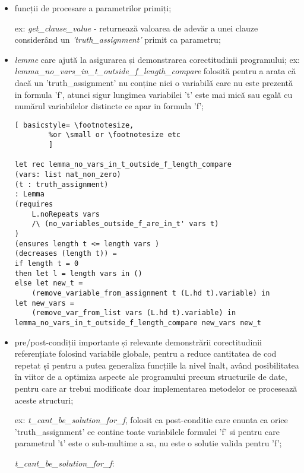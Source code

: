 \begin{itemize}
	\item  funcții de procesare a parametrilor primiți;
		
	ex: \textit{get\_clause\_value }- returnează valoarea de adevăr a unei clauze considerând un \textit{'truth\_assignment'} primit ca parametru;
	
	\item \textit{lemme} care ajută la asigurarea și demonstrarea corectitudinii programului;
	ex: \textit{lemma\_no\_vars\_in\_t\_outside\_f\_length\_compare} folosită pentru a arata că dacă un 'truth\_assignment' nu conține nici o variabilă care nu este prezentă in formula 'f', atunci sigur lungimea variabilei 't' este mai mică sau egală cu numărul variabilelor distincte ce apar in formula 'f';
	
	\begin{lstlisting}[	basicstyle= \footnotesize, 
		%or \small or \footnotesize etc
		]

let rec lemma_no_vars_in_t_outside_f_length_compare
(vars: list nat_non_zero) 
(t : truth_assignment) 
: Lemma
(requires 
	L.noRepeats vars 
	/\ (no_variables_outside_f_are_in_t' vars t)
)
(ensures length t <= length vars ) 
(decreases (length t)) = 
if length t = 0
then let l = length vars in ()
else let new_t = 
	(remove_variable_from_assignment t (L.hd t).variable) in
let new_vars = 
	(remove_var_from_list vars (L.hd t).variable) in
lemma_no_vars_in_t_outside_f_length_compare new_vars new_t

	\end{lstlisting}
	
	\item pre/post-condiții importante și relevante demonstrării corectitudinii referențiate folosind variabile globale, pentru a reduce cantitatea de cod repetat și pentru a putea generaliza funcțiile la nivel înalt, având posibilitatea în viitor de a \newline optimiza aspecte ale programului precum structurile de date, pentru care ar \newline trebui modificate doar implementarea metodelor ce procesează aceste structuri;
	
	ex: \textit{t\_cant\_be\_solution\_for\_f}, folosit ca post-conditie care enunta ca orice 'truth\_assignment' ce contine toate variabilele formulei 'f' si pentru care parametrul 't' este o sub-multime a sa, nu este o solutie valida pentru 'f';
	
	\textit{t\_cant\_be\_solution\_for\_f}:
	

\end{itemize}
